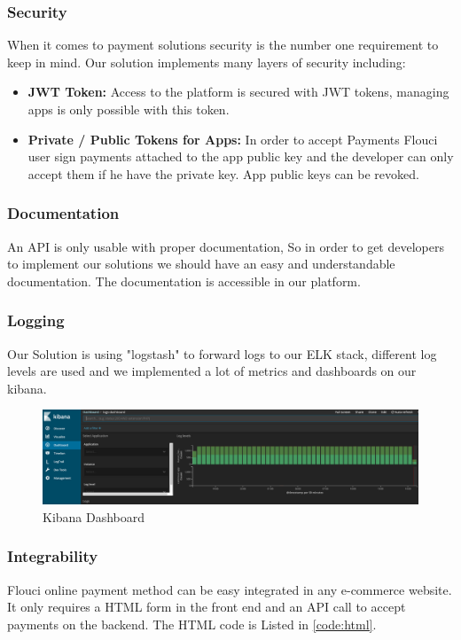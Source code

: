 \begin{spacing}{1.2}
\subsubsection{Security}
When it comes to payment solutions security is the number one requirement to keep in mind.
Our solution implements many layers of security including: 
\begin{itemize}
	\item \textbf{JWT Token\cite{JWT}:}  Access to the platform is secured with JWT tokens, managing apps is only possible with this token.
	\item \textbf{Private / Public Tokens for Apps:}  In order to accept Payments Flouci user sign payments attached to the app public key and the developer can only accept them if he have the private key.
	App public keys can be revoked.
\end{itemize}
\subsubsection{Documentation}
An API is only usable with proper documentation, So in order to get developers to implement our solutions we should have an easy and understandable documentation. The documentation is accessible in our platform.
\subsubsection{Logging}
Our Solution is using "logstash" to forward logs to our ELK\cite{ELK} stack, different log levels are used and we implemented a lot of metrics and dashboards on our kibana.

\begin{figure}[H]\centering
\includegraphics[scale=0.3]{ELK.png}
\caption{Kibana Dashboard}
\label{fig:usecasediagram}
\end{figure}

\subsubsection{Integrability}
Flouci online payment method can be easy integrated in any e-commerce website. It only requires a HTML form in the front end and an API call to accept payments on the backend.
The HTML code is Listed in \ref{code:html}.
\begin{lstlisting}[rulecolor=\color{white}]
\end{lstlisting}


\end{spacing}
